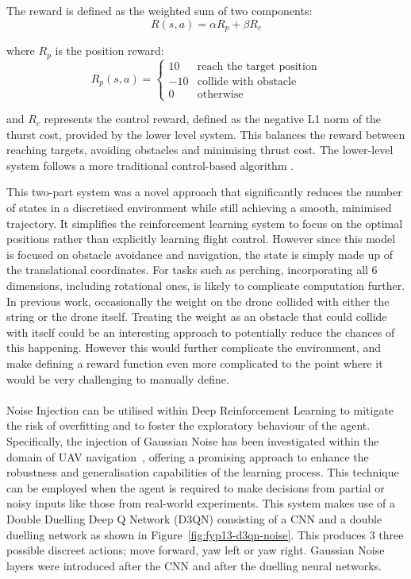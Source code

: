 The reward is defined as the weighted sum of two components:
\[R(s, a) = \alpha R_{p} + \beta R_{c}\]

where $R_{p}$ is the position reward:
\[
R_{p}(s, a) = 
\begin{cases} 
10 & \text{reach the target position} \\
-10 & \text{collide with obstacle} \\
0 & \text{otherwise}
\end{cases}
\]

and $R_{c}$ represents the control reward, defined as the negative L1 norm of the thurst cost, provided by the lower level system.
This balances the reward between reaching targets, avoiding obstacles and minimising thrust cost.
The lower-level system follows a more traditional control-based algorithm \cite{fyp12-waypoint-nav2}.

This two-part system was a novel approach that significantly reduces the number of states in a discretised environment while still achieving a smooth, minimised trajectory.
It simplifies the reinforcement learning system to focus on the optimal positions rather than explicitly learning flight control.
However since this model is focused on obstacle avoidance and navigation, the state is simply made up of the translational coordinates.
For tasks such as perching, incorporating all 6 dimensions, including rotational ones, is likely to complicate computation further.
In previous work, occasionally the weight on the drone collided with either the string or the drone itself.
Treating the weight as an obstacle that could collide with itself could be an interesting approach to potentially reduce the chances of this happening.
However this would further complicate the environment, and make defining a reward function even more complicated to the point where it would be very challenging to manually define. \\\\

Noise Injection can be utilised within Deep Reinforcement Learning to mitigate the risk of overfitting and to foster the exploratory behaviour of the agent.
Specifically, the injection of Gaussian Noise has been investigated within the domain of UAV navigation~\cite{fyp13-noise-injection}, offering a promising approach to enhance the robustness and generalisation capabilities of the learning process.
This technique can be employed when the agent is required to make decisions from partial or noisy inputs like those from real-world experiments.
This system makes use of a Double Duelling Deep Q Network (D3QN) consisting of a CNN and a double duelling network as shown in Figure~\ref{fig:fyp13-d3qn-noise}.
This produces 3 three possible discreet actions; move forward, yaw left or yaw right.
Gaussian Noise layers were introduced after the CNN and after the duelling neural networks.

